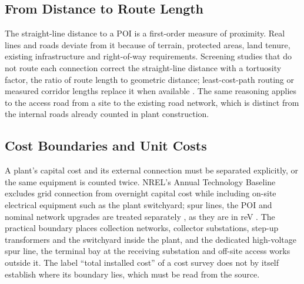 \subsection{From Distance to Route Length}
\label{subsec:route_review}

The straight-line distance to a POI is a first-order measure of
proximity. Real lines and roads deviate from it because of terrain,
protected areas, land tenure, existing infrastructure and right-of-way
requirements. Screening studies that do not route each connection
correct the straight-line distance with a tortuosity factor, the ratio of
route length to geometric distance; least-cost-path routing or measured
corridor lengths replace it when available
\cite{maclaurin2021,miso2024,aemo2023}. The same reasoning applies to the
access road from a site to the existing road network, which is distinct
from the internal roads already counted in plant construction.

\subsection{Cost Boundaries and Unit Costs}
\label{subsec:cost_boundary_review}

A plant's capital cost and its external connection must be separated
explicitly, or the same equipment is counted twice. NREL's Annual
Technology Baseline excludes grid connection from overnight capital cost
while including on-site electrical equipment such as the plant
switchyard; spur lines, the POI and nominal network upgrades are treated
separately \cite{nrelATB2024definitions}, as they are in reV
\cite{maclaurin2021}. The practical boundary places collection networks,
collector substations, step-up transformers and the switchyard inside the
plant, and the dedicated high-voltage spur line, the terminal bay at the
receiving substation and off-site access works outside it. The label
``total installed cost'' of a cost survey does not by itself establish
where its boundary lies, which must be read from the source.

